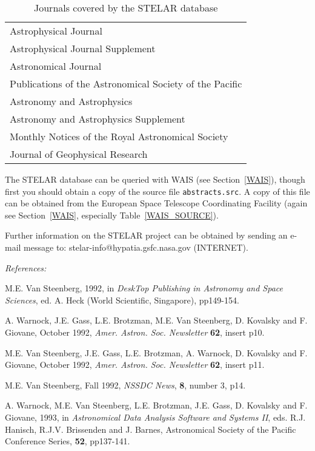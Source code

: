 \documentclass[twoside,11pt,nolof]{starlink}
\begin{document}
\begin{table}[htbp]

\begin{center}
\begin{tabular}{l}
Astrophysical Journal  \\
Astrophysical Journal Supplement  \\
Astronomical Journal  \\
Publications of the Astronomical Society of the Pacific  \\
Astronomy and Astrophysics  \\
Astronomy and Astrophysics Supplement \\
Monthly Notices of the Royal Astronomical Society  \\
Journal of Geophysical Research \\
\end{tabular}
\end{center}

\caption{Journals covered by the STELAR database}
\label{STELAR_JNL}

\end{table}

The STELAR database can be queried with WAIS (see Section~\ref{WAIS}),
though first you should obtain a copy of the source file \texttt{abstracts.src}. A copy of this file can be obtained from the European
Space Telescope Coordinating Facility (again see Section~\ref{WAIS},
especially Table~\ref{WAIS_SOURCE}).

Further information on the STELAR project can be obtained by sending
an e-mail message to: stelar-info@hypatia.gsfc.nasa.gov (INTERNET).

\textit{References:}

M.E. Van Steenberg, 1992, in \textit{DeskTop Publishing in Astronomy and
Space Sciences}, ed. A. Heck (World Scientific, Singapore), pp149-154.

A. Warnock, J.E. Gass, L.E. Brotzman, M.E. Van Steenberg, D. Kovalsky
and F. Giovane, October 1992, \textit{Amer. Astron. Soc. Newsletter} \textbf{62}, insert p10.

M.E. Van Steenberg, J.E. Gass, L.E. Brotzman, A. Warnock, D. Kovalsky
and F. Giovane, October 1992, \textit{Amer. Astron. Soc. Newsletter} \textbf{62}, insert p11.

M.E. Van Steenberg, Fall 1992, \textit{NSSDC News}, \textbf{8}, number 3, p14.

A. Warnock, M.E. Van Steenberg, L.E. Brotzman, J.E. Gass, D. Kovalsky
and F. Giovane, 1993, in \textit{Astronomical Data Analysis Software and
Systems II}, eds. R.J. Hanisch, R.J.V. Brissenden and J. Barnes,
Astronomical Society of the Pacific Conference Series, \textbf{52},
pp137-141.
\end{document}
